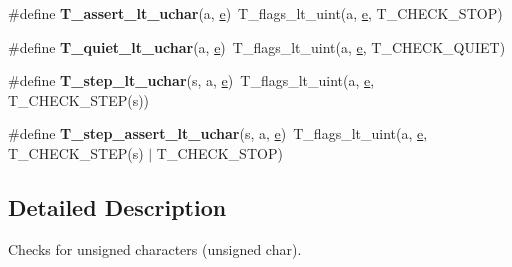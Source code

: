 \begin{DoxyCompactItemize}
\item 
\mbox{\label{group__RTEMSTestFrameworkChecksUChar_gad5df17573339ebf60ea99d07c0783dd5}} 
\#define {\bfseries T\+\_\+assert\+\_\+lt\+\_\+uchar}(a,  \mbox{\hyperlink{sun4u_2tte_8h_a8b0b9ed08e0e18920ec2682f48228c27}{e}})~T\+\_\+flags\+\_\+lt\+\_\+uint(a, \mbox{\hyperlink{sun4u_2tte_8h_a8b0b9ed08e0e18920ec2682f48228c27}{e}}, T\+\_\+\+C\+H\+E\+C\+K\+\_\+\+S\+T\+OP)
\item 
\mbox{\label{group__RTEMSTestFrameworkChecksUChar_ga911c86adef90127d66fbeb8862a5fa8b}} 
\#define {\bfseries T\+\_\+quiet\+\_\+lt\+\_\+uchar}(a,  \mbox{\hyperlink{sun4u_2tte_8h_a8b0b9ed08e0e18920ec2682f48228c27}{e}})~T\+\_\+flags\+\_\+lt\+\_\+uint(a, \mbox{\hyperlink{sun4u_2tte_8h_a8b0b9ed08e0e18920ec2682f48228c27}{e}}, T\+\_\+\+C\+H\+E\+C\+K\+\_\+\+Q\+U\+I\+ET)
\item 
\mbox{\label{group__RTEMSTestFrameworkChecksUChar_ga4da519f35599cb8c652177d91dca5f9d}} 
\#define {\bfseries T\+\_\+step\+\_\+lt\+\_\+uchar}(s,  a,  \mbox{\hyperlink{sun4u_2tte_8h_a8b0b9ed08e0e18920ec2682f48228c27}{e}})~T\+\_\+flags\+\_\+lt\+\_\+uint(a, \mbox{\hyperlink{sun4u_2tte_8h_a8b0b9ed08e0e18920ec2682f48228c27}{e}}, T\+\_\+\+C\+H\+E\+C\+K\+\_\+\+S\+T\+EP(s))
\item 
\mbox{\label{group__RTEMSTestFrameworkChecksUChar_gaef698bae92cb80e42849ee0a4b701c7c}} 
\#define {\bfseries T\+\_\+step\+\_\+assert\+\_\+lt\+\_\+uchar}(s,  a,  \mbox{\hyperlink{sun4u_2tte_8h_a8b0b9ed08e0e18920ec2682f48228c27}{e}})~T\+\_\+flags\+\_\+lt\+\_\+uint(a, \mbox{\hyperlink{sun4u_2tte_8h_a8b0b9ed08e0e18920ec2682f48228c27}{e}}, T\+\_\+\+C\+H\+E\+C\+K\+\_\+\+S\+T\+EP(s) $\vert$ T\+\_\+\+C\+H\+E\+C\+K\+\_\+\+S\+T\+OP)
\end{DoxyCompactItemize}


\subsection{Detailed Description}
Checks for unsigned characters (unsigned char). 

